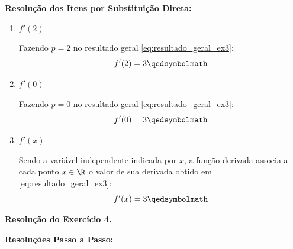 \vspace{0.3cm}
\textbf{Resolução dos Itens por Substituição Direta:}

\begin{enumerate}[label=\alph*)]
    \item $f'(2)$
    
    Fazendo $p = 2$ no resultado geral \eqref{eq:resultado_geral_ex3}:
    \[
    f'(2) = 3 \qedsymbolmath
    \]

    \item $f'(0)$
    
    Fazendo $p = 0$ no resultado geral \eqref{eq:resultado_geral_ex3}:
    \[
    f'(0) = 3 \qedsymbolmath
    \]

    \item $f'(x)$
    
    Sendo a variável independente indicada por $x$, a função derivada associa a cada ponto $x \in \R$ o valor de sua derivada obtido em \eqref{eq:resultado_geral_ex3}:
    \[
    f'(x) = 3 \qedsymbolmath
    \]
\end{enumerate}

\vspace{0.6cm}
\noindent\textbf{Resolução do Exercício 4.}
\label{res:7.2.4}
\setcounter{equation}{0}


\vspace{0.4cm}
\textbf{Resoluções Passo a Passo:}


